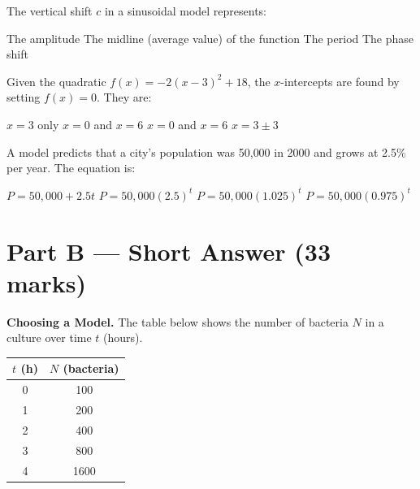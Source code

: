 \documentclass[addpoints]{exam}
\begin{document}
\begin{questions}
\question[1]
The vertical shift $c$ in a sinusoidal model represents:
\begin{choices}
    \choice The amplitude
    \correctchoice The midline (average value) of the function
    \choice The period
    \choice The phase shift
\end{choices}
\vspace{3mm}

\question[1]
Given the quadratic $f(x) = -2(x-3)^2 + 18$, the $x$-intercepts are found by setting $f(x) = 0$. They are:
\begin{choices}
    \choice $x = 3$ only
    \choice $x = 0$ and $x = 6$
    \correctchoice $x = 0$ and $x = 6$
    \choice $x = 3 \pm 3$
\end{choices}
\vspace{3mm}

\question[1]
A model predicts that a city's population was 50{,}000 in 2000 and grows at 2.5\% per year. The equation is:
\begin{choices}
    \choice $P = 50{,}000 + 2.5t$
    \choice $P = 50{,}000(2.5)^t$
    \correctchoice $P = 50{,}000(1.025)^t$
    \choice $P = 50{,}000(0.975)^t$
\end{choices}
\vspace{3mm}

\section*{Part B --- Short Answer (33 marks)}

\vspace{5mm}

\question[5]
\textbf{Choosing a Model.}
The table below shows the number of bacteria $N$ in a culture over time $t$ (hours).

\begin{center}
\begin{tabular}{@{}cc@{}}
\toprule
$t$ (h) & $N$ (bacteria) \\
\midrule
0 & 100 \\
1 & 200 \\
2 & 400 \\
3 & 800 \\
4 & 1600 \\
\bottomrule
\end{tabular}
\end{center}

\end{questions}
\end{document}
